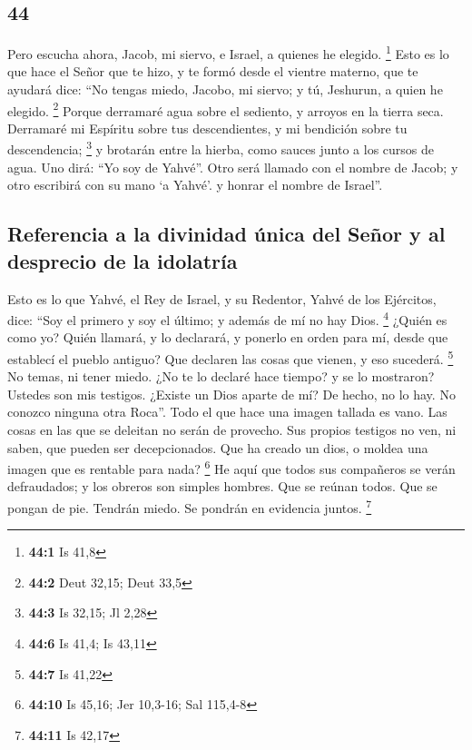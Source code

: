 \begin{paracol}{2}
\hypertarget{section-86}{%
\section{44}\label{section-86}}

 Pero escucha ahora, Jacob, mi siervo, e Israel, a quienes
he elegido. \footnote{\textbf{44:1} Is 41,8}  Esto es lo
que hace el Señor que te hizo, y te formó desde el vientre materno, que
te ayudará dice: ``No tengas miedo, Jacobo, mi siervo; y tú, Jeshurun, a
quien he elegido. \footnote{\textbf{44:2} Deut 32,15; Deut 33,5}
 Porque derramaré agua sobre el sediento, y arroyos en la
tierra seca. Derramaré mi Espíritu sobre tus descendientes, y mi
bendición sobre tu descendencia; \footnote{\textbf{44:3} Is 32,15; Jl
  2,28}  y brotarán entre la hierba, como sauces junto a
los cursos de agua.  Uno dirá: ``Yo soy de Yahvé''. Otro
será llamado con el nombre de Jacob; y otro escribirá con su mano `a
Yahvé'. y honrar el nombre de Israel''.

\hypertarget{referencia-a-la-divinidad-uxfanica-del-seuxf1or-y-al-desprecio-de-la-idolatruxeda}{%
\subsection{Referencia a la divinidad única del Señor y al desprecio de
la
idolatría}\label{referencia-a-la-divinidad-uxfanica-del-seuxf1or-y-al-desprecio-de-la-idolatruxeda}}

 Esto es lo que Yahvé, el Rey de Israel, y su Redentor,
Yahvé de los Ejércitos, dice: ``Soy el primero y soy el último; y además
de mí no hay Dios. \footnote{\textbf{44:6} Is 41,4; Is 43,11}
 ¿Quién es como yo? Quién llamará, y lo declarará, y
ponerlo en orden para mí, desde que establecí el pueblo antiguo? Que
declaren las cosas que vienen, y eso sucederá. \footnote{\textbf{44:7}
  Is 41,22}  No temas, ni tener miedo. ¿No te lo declaré
hace tiempo? y se lo mostraron? Ustedes son mis testigos. ¿Existe un
Dios aparte de mí? De hecho, no lo hay. No conozco ninguna otra Roca''.
 Todo el que hace una imagen tallada es vano. Las cosas en
las que se deleitan no serán de provecho. Sus propios testigos no ven,
ni saben, que pueden ser decepcionados.  Que ha creado un
dios, o moldea una imagen que es rentable para nada? \footnote{\textbf{44:10}
  Is 45,16; Jer 10,3-16; Sal 115,4-8}  He aquí que todos
sus compañeros se verán defraudados; y los obreros son simples hombres.
Que se reúnan todos. Que se pongan de pie. Tendrán miedo. Se pondrán en
evidencia juntos. \footnote{\textbf{44:11} Is 42,17}


\end{paracol}
